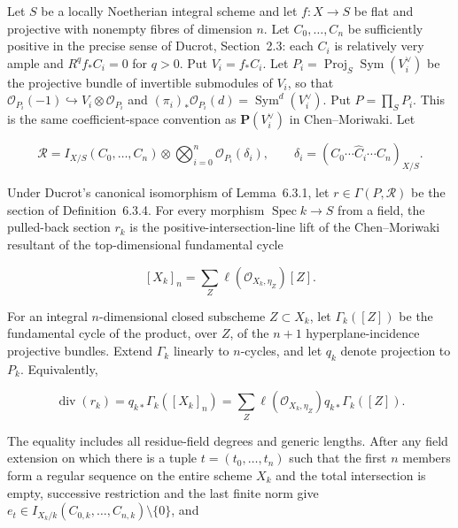 
\begin{theorem}
\label{thm:p171-revised2-complete-resultant}
Let \(S\) be a locally Noetherian integral scheme and let
\(f:X\to S\) be flat and projective with nonempty fibres of dimension
\(n\).  Let \(C_0,\ldots,C_n\) be sufficiently positive in the precise
sense of Ducrot, Section~2.3: each \(C_i\) is relatively very ample and
\(R^qf_*C_i=0\) for \(q>0\).  Put \(V_i=f_*C_i\).  Let
\(P_i=\operatorname{Proj}_S\operatorname{Sym}(V_i^\vee)\) be the projective
bundle of invertible submodules of \(V_i\), so that
\(\mathcal O_{P_i}(-1)\hookrightarrow V_i\otimes\mathcal O_{P_i}\) and
\((\pi_i)_*\mathcal O_{P_i}(d)=\operatorname{Sym}^d(V_i^\vee)\).
Put \(P=\prod_SP_i\).  This is the same coefficient-space convention as
\(\mathbf P(V_i^\vee)\) in Chen--Moriwaki.  Let

\[
 \mathscr R=I_{X/S}(C_0,\ldots,C_n)\otimes
 \bigotimes_{i=0}^n\mathcal O_{P_i}(\delta_i),
 \qquad
 \delta_i=(C_0\cdots\widehat C_i\cdots C_n)_{X/S}.
\]

Under Ducrot's canonical isomorphism of Lemma~6.3.1, let
\(r\in\Gamma(P,\mathscr R)\) be the section of Definition~6.3.4.  For
every morphism \(\operatorname{Spec}k\to S\) from a field, the pulled-back
section \(r_k\) is the positive-intersection-line lift of the
Chen--Moriwaki resultant of the top-dimensional fundamental cycle

\[
 [X_k]_n=\sum_Z
 \ell(\mathcal O_{X_k,\eta_Z})[Z].
\]

For an integral \(n\)-dimensional closed subscheme \(Z\subset X_k\), let
\(\Gamma_k([Z])\) be the fundamental cycle of the product, over \(Z\), of
the \(n+1\) hyperplane-incidence projective bundles.  Extend \(\Gamma_k\)
linearly to \(n\)-cycles, and let \(q_k\) denote projection to \(P_k\).
Equivalently,

\begin{equation}
 \operatorname{div}(r_k)
 =q_{k*}\Gamma_k([X_k]_n)
 =\sum_Z\ell(\mathcal O_{X_k,\eta_Z})
   q_{k*}\Gamma_k([Z]).
 \label{eq:p171-revised2-divisor-cycle}
\end{equation}

The equality includes all residue-field degrees and generic lengths.
After any field extension on which there is a tuple
\(t=(t_0,\ldots,t_n)\) such that the first \(n\) members form a regular
sequence on the entire scheme \(X_k\) and the total intersection is empty,
successive restriction and the last finite norm give
\(e_t\in I_{X_k/k}(C_{0,k},\ldots,C_{n,k})\setminus\{0\}\), and


\end{theorem}
